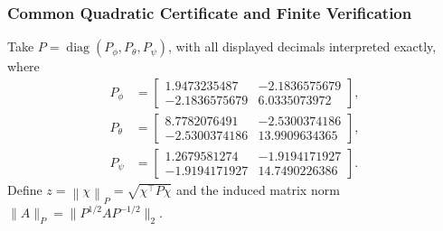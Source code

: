 \documentclass[12pt, a4paper]{article}
\begin{document}
\subsubsection{Common Quadratic Certificate and Finite Verification}
\label{uhrc:sec:common}

Take $P=\operatorname{diag}(P_\phi,P_\theta,P_\psi)$, with all displayed decimals
interpreted exactly, where
\begin{align}
 P_\phi&=\begin{bmatrix}
 1.9473235487&-2.1836575679\\-2.1836575679&6.0335073972
 \end{bmatrix},\nonumber\\
 P_\theta&=\begin{bmatrix}
 8.7782076491&-2.5300374186\\-2.5300374186&13.9909634365
 \end{bmatrix},\nonumber\\
 P_\psi&=\begin{bmatrix}
 1.2679581274&-1.9194171927\\-1.9194171927&14.7490226386
 \end{bmatrix}.
 \label{eq:common_sampled_certificate}
\end{align}
Define $z=\left\lVert \chi\right\rVert_{P}=\sqrt{\chi^\top P\chi}$ and the induced matrix norm
$\|A\|_P=\|P^{1/2}AP^{-1/2}\|_2$.
\end{document}
